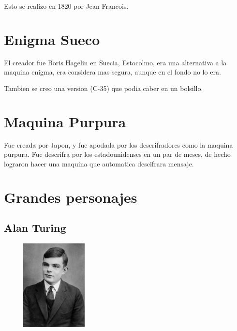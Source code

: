 \documentclass[12pt, fleqn]{report}                             %
\theoremstyle{break}                                            %
\begin{document}
            Esto se realizo en 1820 por Jean Francois.

        \clearpage
        \section{Enigma Sueco}

            El creador fue Boris Hagelin en Suecia, Estocolmo, era una alternativa a la maquina enigma, 
            era considera mas segura, aunque en el fondo no lo era.

            Tambien se creo una version (C-35) que podia caber en un bolsillo.

        \clearpage
        \section{Maquina Purpura}

            Fue creada por Japon, y fue apodada por los descrifradores como la maquina purpura.
            Fue descrifra por los estadounidenses en un par de meses, de hecho lograron hacer una maquina que automatica
            descifrara mensaje.


        \clearpage
        \section{Grandes personajes}

            \subsection{Alan Turing}

                \begin{figure}
                    \centering
                    \includegraphics[width=0.30\textwidth]{Turing}
                \end{figure}
\end{document}

